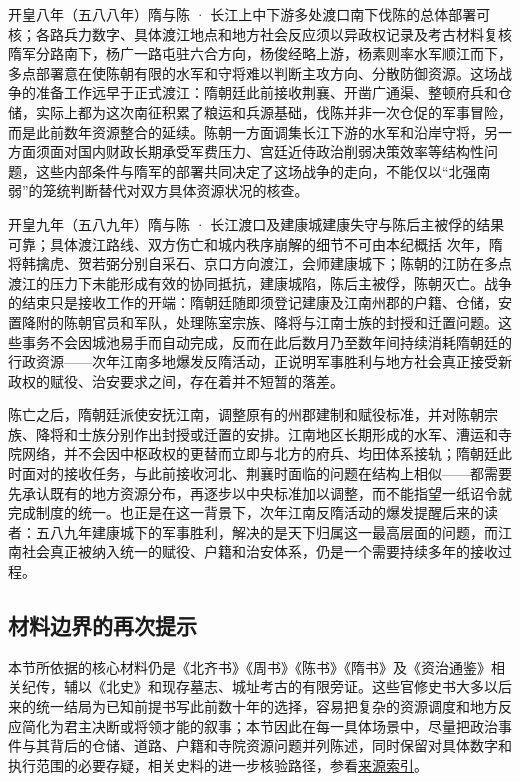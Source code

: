 \begin{event}{}{开皇八年（五八八年）}{隋与陈 · 长江上中下游多处渡口}{南下伐陈的总体部署可核；各路兵力数字、具体渡江地点和地方社会反应须以异政权记录及考古材料复核}
隋军分路南下，杨广一路屯驻六合方向，杨俊经略上游，杨素则率水军顺江而下，多点部署意在使陈朝有限的水军和守将难以判断主攻方向、分散防御资源。这场战争的准备工作远早于正式渡江：隋朝廷此前接收荆襄、开凿广通渠、整顿府兵和仓储，实际上都为这次南征积累了粮运和兵源基础，伐陈并非一次仓促的军事冒险，而是此前数年资源整合的延续。陈朝一方面调集长江下游的水军和沿岸守将，另一方面须面对国内财政长期承受军费压力、宫廷近侍政治削弱决策效率等结构性问题，这些内部条件与隋军的部署共同决定了这场战争的走向，不能仅以“北强南弱”的笼统判断替代对双方具体资源状况的核查。
\end{event}

\begin{event}{}{开皇九年（五八九年）}{隋与陈 · 长江渡口及建康城}{建康失守与陈后主被俘的结果可靠；具体渡江路线、双方伤亡和城内秩序崩解的细节不可由本纪概括}
次年，隋将韩擒虎、贺若弼分别自采石、京口方向渡江，会师建康城下；陈朝的江防在多点渡江的压力下未能形成有效的协同抵抗，建康城陷，陈后主被俘，陈朝灭亡。战争的结束只是接收工作的开端：隋朝廷随即须登记建康及江南州郡的户籍、仓储，安置降附的陈朝官员和军队，处理陈室宗族、降将与江南士族的封授和迁置问题。这些事务不会因城池易手而自动完成，反而在此后数月乃至数年间持续消耗隋朝廷的行政资源——次年江南多地爆发反隋活动，正说明军事胜利与地方社会真正接受新政权的赋役、治安要求之间，存在着并不短暂的落差。
\end{event}

陈亡之后，隋朝廷派使安抚江南，调整原有的州郡建制和赋役标准，并对陈朝宗族、降将和士族分别作出封授或迁置的安排。江南地区长期形成的水军、漕运和寺院网络，并不会因中枢政权的更替而立即与北方的府兵、均田体系接轨；隋朝廷此时面对的接收任务，与此前接收河北、荆襄时面临的问题在结构上相似——都需要先承认既有的地方资源分布，再逐步以中央标准加以调整，而不能指望一纸诏令就完成制度的统一。也正是在这一背景下，次年江南反隋活动的爆发提醒后来的读者：五八九年建康城下的军事胜利，解决的是天下归属这一最高层面的问题，而江南社会真正被纳入统一的赋役、户籍和治安体系，仍是一个需要持续多年的接收过程。

\subsection{材料边界的再次提示}

本节所依据的核心材料仍是《北齐书》《周书》《陈书》《隋书》及《资治通鉴》相关纪传，辅以《北史》和现存墓志、城址考古的有限旁证。这些官修史书大多以后来的统一结局为已知前提书写此前数十年的选择，容易把复杂的资源调度和地方反应简化为君主决断或将领才能的叙事；本节因此在每一具体场景中，尽量把政治事件与其背后的仓储、道路、户籍和寺院资源问题并列陈述，同时保留对具体数字和执行范围的必要存疑，相关史料的进一步核验路径，参看\hyperref[app:sources]{来源索引}。

